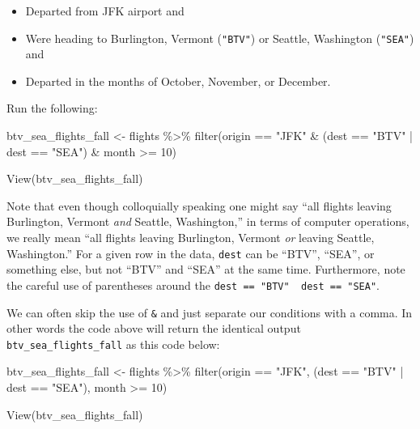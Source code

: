 \documentclass[
  letterpaper,
  DIV=11,
  numbers=noendperiod]{scrreprt}
\newenvironment{Shaded}{\begin{snugshade}}{\end{snugshade}}
\newcommand{\DecValTok}[1]{\textcolor[rgb]{0.68,0.00,0.00}{#1}}
\newcommand{\FunctionTok}[1]{\textcolor[rgb]{0.28,0.35,0.67}{#1}}
\newcommand{\NormalTok}[1]{\textcolor[rgb]{0.00,0.23,0.31}{#1}}
\newcommand{\OtherTok}[1]{\textcolor[rgb]{0.00,0.23,0.31}{#1}}
\newcommand{\SpecialCharTok}[1]{\textcolor[rgb]{0.37,0.37,0.37}{#1}}
\newcommand{\StringTok}[1]{\textcolor[rgb]{0.13,0.47,0.30}{#1}}
\providecommand{\tightlist}{%
  \setlength{\itemsep}{0pt}\setlength{\parskip}{0pt}}\usepackage{longtable,booktabs,array}
\theoremstyle{definition}
\theoremstyle{remark}
\begin{document}
\begin{itemize}
\tightlist
\item
  Departed from JFK airport and
\item
  Were heading to Burlington, Vermont (\texttt{"BTV"}) or Seattle,
  Washington (\texttt{"SEA"}) and
\item
  Departed in the months of October, November, or December.
\end{itemize}

Run the following:

\begin{Shaded}
\begin{Highlighting}[]
\NormalTok{btv\_sea\_flights\_fall }\OtherTok{\textless{}{-}}\NormalTok{ flights }\SpecialCharTok{\%\textgreater{}\%} 
  \FunctionTok{filter}\NormalTok{(origin }\SpecialCharTok{==} \StringTok{"JFK"} \SpecialCharTok{\&}\NormalTok{ (dest }\SpecialCharTok{==} \StringTok{"BTV"} \SpecialCharTok{|}\NormalTok{ dest }\SpecialCharTok{==} \StringTok{"SEA"}\NormalTok{) }\SpecialCharTok{\&}\NormalTok{ month }\SpecialCharTok{\textgreater{}=} \DecValTok{10}\NormalTok{)}

\FunctionTok{View}\NormalTok{(btv\_sea\_flights\_fall)}
\end{Highlighting}
\end{Shaded}

Note that even though colloquially speaking one might say ``all flights
leaving Burlington, Vermont \emph{and} Seattle, Washington,'' in terms
of computer operations, we really mean ``all flights leaving Burlington,
Vermont \emph{or} leaving Seattle, Washington.'' For a given row in the
data, \texttt{dest} can be ``BTV'', ``SEA'', or something else, but not
``BTV'' and ``SEA'' at the same time. Furthermore, note the careful use
of parentheses around the
\texttt{dest\ ==\ "BTV"\ \textbar{}\ dest\ ==\ "SEA"}.

We can often skip the use of \texttt{\&} and just separate our
conditions with a comma. In other words the code above will return the
identical output \texttt{btv\_sea\_flights\_fall} as this code below:

\begin{Shaded}
\begin{Highlighting}[]
\NormalTok{btv\_sea\_flights\_fall }\OtherTok{\textless{}{-}}\NormalTok{ flights }\SpecialCharTok{\%\textgreater{}\%} 
  \FunctionTok{filter}\NormalTok{(origin }\SpecialCharTok{==} \StringTok{"JFK"}\NormalTok{, (dest }\SpecialCharTok{==} \StringTok{"BTV"} \SpecialCharTok{|}\NormalTok{ dest }\SpecialCharTok{==} \StringTok{"SEA"}\NormalTok{), month }\SpecialCharTok{\textgreater{}=} \DecValTok{10}\NormalTok{)}

\FunctionTok{View}\NormalTok{(btv\_sea\_flights\_fall)}
\end{Highlighting}
\end{Shaded}
\end{document}
